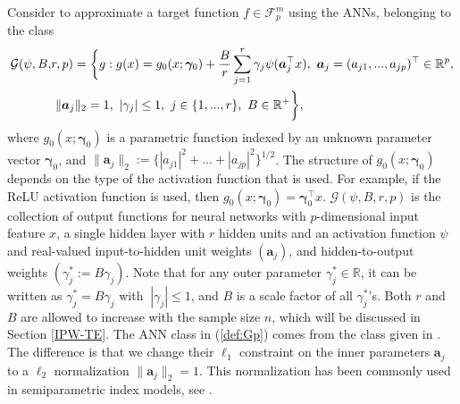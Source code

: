 \documentclass[11pt]{article}
\def\bs{\boldsymbol}
\numberwithin{equation}{section}
\begin{document}
Consider to approximate a target function $f\in \mathcal{F}^m_p$ using the ANNs, belonging to the class
\begin{align}
	\mathcal{G}(\psi,B,&r,p)
	=\bigg\{g:g(x)=g_0(x;\boldsymbol{\gamma}_0)+\frac{B}{r}\sum_{j=1}^{r} \gamma_j\psi(\bs{a}_j^\top x),\ \bs{a}_j=(a_{j1},...,a_{jp})^\top\in\mathbb{R}^p, \notag\\ & \ \|\bs{a}_{j}\|_2= 1, \ |\gamma_j|\leq 1, \ j\in\{1,...,r\}, \ B\in \mathbb{R}^+   \bigg\},\label{def:Gp}
\end{align}
where  $g_0(x;\boldsymbol{\gamma}_0)$ is a parametric function indexed by an unknown parameter vector $\boldsymbol{\gamma}_0$, and $\|\bs{a}_{j}\|_2:=\{|a_{j1}|^2+...+|a_{jp}|^2\}^{1/2}$. The structure of $g_0(x;\boldsymbol{\gamma}_0)$ depends on the type of the activation function that is used. For example, if the ReLU activation function is used, then $g_0(x;\boldsymbol{\gamma}_0)=\boldsymbol{\gamma}_0^\top x$. $\mathcal{G}(\psi,B,r,p)$ is the collection of output functions for neural networks with $p$-dimensional input feature $x$,  a single hidden layer with $r$ hidden units and an activation function $\psi$ and real-valued input-to-hidden unit weights $(\bs{a}_j)$, and hidden-to-output weights $(\gamma_j^*:=B\gamma_j)$. Note that for any outer parameter $\gamma_j^*\in \mathbb{R}$, it can be written as $\gamma_j^*=B\gamma_j$ with $\ |\gamma_j|\leq 1$, and $B$ is a scale factor of all  $\gamma_j^*$'s. Both $r$ and $B$ are allowed to increase with the sample size $n$, which will be discussed in Section \ref{IPW-TE}. The ANN class in (\ref{def:Gp}) comes from the class given in \cite{klusowski2018approximation}. The difference is that we change their $\ell_1$ constraint on the inner parameters $\bs{a}_j$ to a $\ell_2$ normalization $\|\bs{a}_{j}\|_2= 1$. This normalization has been commonly used in semiparametric index models, see   \cite{mahesingle2016}.
\end{document}
